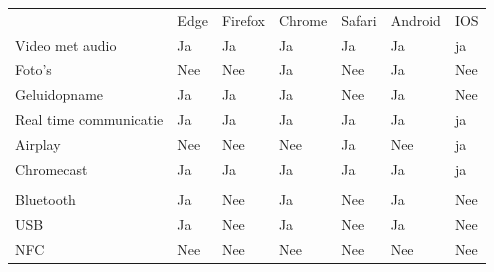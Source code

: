 	\begin{table}[]
		\centering
		\begin{tabular}{p{6cm}p{13mm}p{15mm}p{13mm}p{13mm}p{13mm}p{13mm}}
			& Edge & Firefox & Chrome & Safari& Android & IOS \\ 
			
			Video met audio & \cellcolor{green!40} Ja  & \cellcolor{green!40} Ja & \cellcolor{green!40} Ja  & \cellcolor{green!40} Ja & \cellcolor{green!40} Ja & \cellcolor{green!40} ja \\
			
			Foto's & \cellcolor{red!50} Nee  & \cellcolor{red!50} Nee & \cellcolor{green!40} Ja  & \cellcolor{red!50} Nee  & \cellcolor{green!40} Ja & \cellcolor{red!50} Nee \\
			
			Geluidopname & \cellcolor{green!40} Ja  & \cellcolor{green!40} Ja & \cellcolor{green!40} Ja & \cellcolor{red!50} Nee  & \cellcolor{green!40} Ja & \cellcolor{red!50} Nee \\
			
			Real time communicatie& \cellcolor{green!40} Ja  & \cellcolor{green!40} Ja & \cellcolor{green!40} Ja  & \cellcolor{green!40} Ja & \cellcolor{green!40} Ja & \cellcolor{green!40} ja \\
			
			Airplay & \cellcolor{red!50} Nee & \cellcolor{red!50} Nee & \cellcolor{red!50} Nee  & \cellcolor{green!40} Ja & \cellcolor{red!50} Nee & \cellcolor{green!40} ja \\
			
			Chromecast & \cellcolor{green!40} Ja  & \cellcolor{green!40} Ja & \cellcolor{green!40} Ja  & \cellcolor{green!40} Ja & \cellcolor{green!40} Ja & \cellcolor{green!40} ja \\
			
			 &  & &  &  &  &  \\
			 
			 Bluetooth & \cellcolor{green!40} Ja  &  \cellcolor{red!50} Nee & \cellcolor{green!40} Ja  & \cellcolor{red!50} Nee & \cellcolor{green!40} Ja &  \cellcolor{red!50} Nee \\
			 
			 USB & \cellcolor{green!40} Ja  &  \cellcolor{red!50} Nee & \cellcolor{green!40} Ja  & \cellcolor{red!50} Nee & \cellcolor{green!40} Ja &  \cellcolor{red!50} Nee \\
			 
			 NFC &  \cellcolor{red!50} Nee  &  \cellcolor{red!50} Nee &  \cellcolor{red!50} Nee  & \cellcolor{red!50} Nee &  \cellcolor{red!50} Nee &  \cellcolor{red!50} Nee \\
			 

\end{tabular}
\end{table}
